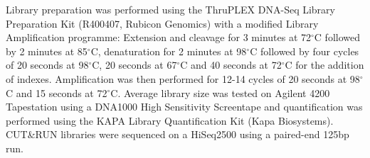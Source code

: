 Library preparation was performed using the ThruPLEX\textsuperscript{\textregistered} DNA-Seq Library Preparation Kit (R400407, Rubicon Genomics) with a modified Library Amplification programme: Extension and cleavage for 3 minutes at 72$^\circ$C followed by 2 minutes at 85$^\circ$C, denaturation for 2 minutes at 98$^\circ$C followed by four cycles of 20 seconds at 98$^\circ$C, 20 seconds at 67$^\circ$C and 40 seconds at 72$^\circ$C for the addition of indexes. Amplification was then performed for 12-14 cycles of 20 seconds at 98$^\circ$C and 15 seconds at 72$^\circ$C. Average library size was tested on Agilent 4200 Tapestation using a DNA1000 High Sensitivity Screentape and quantification was performed using the KAPA Library Quantification Kit (Kapa Biosystems). CUT\&{}RUN libraries were sequenced on a HiSeq2500 using a paired-end 125bp run. 

